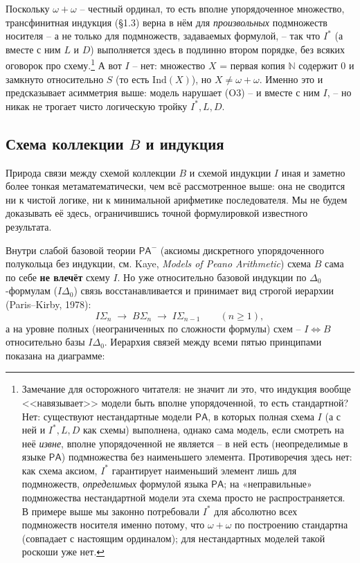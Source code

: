 \documentclass[12pt,a4paper]{article}
\theoremstyle{plain}
\theoremstyle{definition}
\newcommand{\toinf}{\rightarrow}
\newcommand{\PA}{\textsf{PA}}
\begin{document}
Поскольку $\omega+\omega$ -- честный ординал, то есть вполне упорядоченное множество, трансфинитная индукция (§1.3) верна в нём для \emph{произвольных} подмножеств носителя -- а не только для подмножеств, задаваемых формулой, -- так что $I^*$ (а вместе с ним $L$ и $D$) выполняется здесь в подлинно втором порядке, без всяких оговорок про схему.\footnote{Замечание для осторожного читателя: не значит ли это, что индукция вообще <<навязывает>> модели быть вполне упорядоченной, то есть стандартной? Нет: существуют нестандартные модели $\PA$, в которых полная схема $I$ (а с ней и $I^*,L,D$ как схемы) выполнена, однако сама модель, если смотреть на неё \emph{извне}, вполне упорядоченной не является -- в ней есть (неопределимые в языке $\PA$) подмножества без наименьшего элемента. Противоречия здесь нет: как схема аксиом, $I^*$ гарантирует наименьший элемент лишь для подмножеств, \emph{определимых} формулой языка $\PA$; на «неправильные» подмножества нестандартной модели эта схема просто не распространяется. В примере выше мы законно потребовали $I^*$ для абсолютно всех подмножеств носителя именно потому, что $\omega+\omega$ по построению стандартна (совпадает с настоящим ординалом); для нестандартных моделей такой роскоши уже нет.} А вот $I$ -- нет: множество $X$ = первая копия $\mathbb N$ содержит $0$ и замкнуто относительно $S$ (то есть $\mathrm{Ind}(X)$), но $X\ne\omega+\omega$. Именно это и предсказывает асимметрия выше: модель нарушает (O3) -- и вместе с ним $I$, -- но никак не трогает чисто логическую тройку $I^*, L, D$.

\subsection{Схема коллекции $B$ и индукция}
Природа связи между схемой коллекции $B$ и схемой индукции $I$ иная и заметно более тонкая метаматематически, чем всё рассмотренное выше: она не сводится ни к чистой логике, ни к минимальной арифметике последователя. Мы не будем доказывать её здесь, ограничившись точной формулировкой известного результата.

Внутри слабой базовой теории $\PA^-$ (аксиомы дискретного упорядоченного полукольца без индукции, см. Kaye, \textit{Models of Peano Arithmetic}) схема $B$ сама по себе \textbf{не влечёт} схему $I$. Но уже относительно базовой индукции по $\Delta_0$-формулам ($I\Delta_0$) связь восстанавливается и принимает вид строгой иерархии (Paris--Kirby, 1978):
$$I\Sigma_n \;\toinf\; B\Sigma_n \;\toinf\; I\Sigma_{n-1} \qquad (n\ge1),$$
а на уровне полных (неограниченных по сложности формулы) схем -- $I \iff B$ относительно базы $I\Delta_0$. Иерархия связей между всеми пятью принципами показана на диаграмме:
\end{document}
